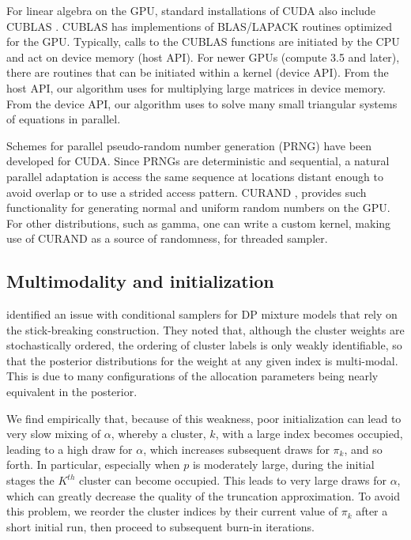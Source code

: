 For linear algebra on the GPU, standard installations of CUDA also
include CUBLAS \cite{cublas}. CUBLAS has implementions of BLAS/LAPACK
routines optimized for the GPU. Typically, calls to the CUBLAS
functions are initiated by the CPU and act on device memory (host
API). For newer GPUs (compute 3.5 and later), there are routines that
can be initiated within a kernel (device API). From the host API, our
algorithm uses  for multiplying large matrices in
device memory. From the
device API, our algorithm uses  to solve many small triangular
systems of equations in parallel.

Schemes for parallel pseudo-random number generation (PRNG) have been
developed for CUDA. Since PRNGs are deterministic and sequential, a
natural parallel adaptation is access the same sequence at locations
distant enough to avoid overlap or to use a strided access
pattern. CURAND \cite{curand}, provides such functionality for generating
normal and uniform random numbers on the GPU. For other distributions,
such as gamma,
one can write a custom kernel, making use of CURAND as a source of
randomness, for threaded sampler.

\subsection{Multimodality and initialization}
\label{subsec:initialization}
\citet{papas} identified an issue with conditional samplers for DP
mixture models that rely on the stick-breaking construction. They
noted that, although the cluster weights are stochastically
ordered, the ordering of cluster labels is only weakly identifiable,
so that the posterior distributions for the weight at any given index
is multi-modal. This is due to many configurations of the allocation
parameters being nearly equivalent in the posterior. 

We find empirically that, because of this weakness, poor initialization can
lead to very slow mixing of $\alpha$, whereby a cluster, $k$, with a large
index becomes occupied, leading to a high draw for $\alpha$, which
increases subsequent draws for $\pi_k$, and so forth. In particular,
especially when $p$ is moderately large, during the initial stages the
$K^{th}$ cluster can become occupied. This leads to very large draws
for $\alpha$, which can greatly decrease the quality of the truncation
approximation. To avoid this problem, we reorder the cluster indices by their current value of $\pi_k$ after a short initial run, then proceed to subsequent burn-in iterations. 

